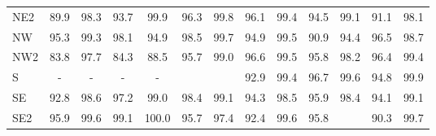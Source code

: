 \begin{table}[H]
\begin{tabular}{lcccccccccccc}
        NE2                                        & 89.9                     & 98.3                     & 93.7                     & 99.9                     & 96.3                                                & 99.8                                                & 96.1                 & 99.4 & 94.5                 & 99.1                                                & 91.1                                                & 98.1 \\
        NW                                         & 95.3                     & 99.3                     & 98.1                     & 94.9                     & 98.5                                                & 99.7                                                & 94.9                 & 99.5 & 90.9                 & 94.4                                                & 96.5                                                & 98.7 \\
        NW2                                        & 83.8                     & 97.7                     & 84.3                     & 88.5                     & 95.7                                                & 99.0                                                & 96.6                 & 99.5 & 95.8                 & 98.2                                                & 96.4                                                & 99.4 \\
        S                                          & -                        & -                        & -                        & -                        & \cellcolor[HTML]{CB0000}{\color[HTML]{FFFFFF} 22.8} & \cellcolor[HTML]{CB0000}{\color[HTML]{FFFFFF} 23.7} & 92.9                 & 99.4 & 96.7                 & 99.6                                                & 94.8                                                & 99.9 \\
        SE                                         & 92.8                     & 98.6                     & 97.2                     & 99.0                     & 98.4                                                & 99.1                                                & 94.3                 & 98.5 & 95.9                 & 98.4                                                & 94.1                                                & 99.1 \\
        SE2                                        & 95.9                     & 99.6                     & 99.1                     & 100.0                    & 95.7                                                & 97.4                                                & 92.4                 & 99.6 & 95.8                 & \cellcolor[HTML]{CB0000}{\color[HTML]{FFFFFF} 64.2} & 90.3                                                & 99.7 \\

\end{tabular}
\end{table}
